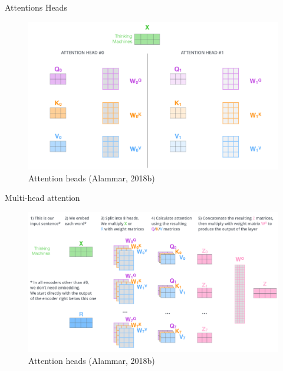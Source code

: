 \documentclass[10pt]{beamer}
\begin{document}
\begin{frame}{Attentions Heads}

\begin{figure}[h]
\centering
\includegraphics[width=1\textwidth]{fig/alammar_transformer_attention_heads_qkv.png}
\caption{Attention heads (Alammar, 2018b)}
\end{figure}

\end{frame}


\begin{frame}{Multi-head attention}

\begin{figure}[h]
\centering
\includegraphics[width=1\textwidth]{fig/alammar_transformer_multi-headed_self-attention-recap.png}
\caption{Attention heads (Alammar, 2018b)}
\end{figure}

\end{frame}
\end{document}
